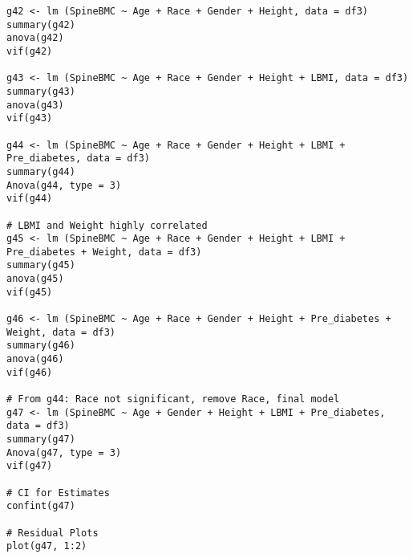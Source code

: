 \documentclass[11pt]{article}
\begin{document}
\begin{verbatim}
g42 <- lm (SpineBMC ~ Age + Race + Gender + Height, data = df3)
summary(g42)
anova(g42)
vif(g42)

g43 <- lm (SpineBMC ~ Age + Race + Gender + Height + LBMI, data = df3)
summary(g43)
anova(g43)
vif(g43)

g44 <- lm (SpineBMC ~ Age + Race + Gender + Height + LBMI + Pre_diabetes, data = df3)
summary(g44)
Anova(g44, type = 3)
vif(g44)

# LBMI and Weight highly correlated
g45 <- lm (SpineBMC ~ Age + Race + Gender + Height + LBMI + Pre_diabetes + Weight, data = df3)
summary(g45)
anova(g45)
vif(g45)

g46 <- lm (SpineBMC ~ Age + Race + Gender + Height + Pre_diabetes + Weight, data = df3)
summary(g46)
anova(g46)
vif(g46)

# From g44: Race not significant, remove Race, final model
g47 <- lm (SpineBMC ~ Age + Gender + Height + LBMI + Pre_diabetes, data = df3)
summary(g47)
Anova(g47, type = 3)
vif(g47)

# CI for Estimates
confint(g47)

# Residual Plots
plot(g47, 1:2)

\end{verbatim}
\fi
\end{document}
